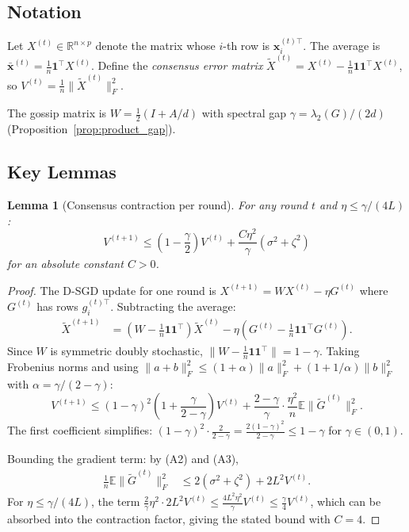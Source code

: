 \documentclass{article}
\newtheorem{lemma}[theorem]{Lemma}
\newcommand{\R}{\mathbb{R}}
\newcommand{\E}{\mathbb{E}}
\newcommand{\bx}{\mathbf{x}}
\newcommand{\lam}{\lambda_2}
\begin{document}
\subsection{Notation}

Let $X^{(t)} \in \R^{n \times p}$ denote the matrix whose $i$-th row
is $\bx_i^{(t)\top}$.  The average is
$\bar{\bx}^{(t)} = \frac{1}{n}\mathbf{1}^\top X^{(t)}$.
Define the \emph{consensus error matrix}
$\tilde{X}^{(t)} = X^{(t)} - \frac{1}{n}\mathbf{1}\mathbf{1}^\top X^{(t)}$,
so $V^{(t)} = \frac{1}{n}\|\tilde{X}^{(t)}\|_F^2$.

The gossip matrix is $W = \frac{1}{2}(I + A/d)$ with
spectral gap $\gamma = \lam(G)/(2d)$ (Proposition~\ref{prop:product_gap}).

\subsection{Key Lemmas}

\begin{lemma}[Consensus contraction per round]
\label{lem:consensus_contract}
For any round $t$ and $\eta \le \gamma/(4L)$:
\[
V^{(t+1)} \le \left(1 - \frac{\gamma}{2}\right) V^{(t)}
+ \frac{C\eta^2}{\gamma}\left(\sigma^2 + \zeta^2\right)
\]
for an absolute constant $C > 0$.
\end{lemma}
\begin{proof}
The D-SGD update for one round is
$X^{(t+1)} = W X^{(t)} - \eta G^{(t)}$
where $G^{(t)}$ has rows $g_i^{(t)\top}$.  Subtracting the average:
\begin{align*}
\tilde{X}^{(t+1)} &= \left(W - \tfrac{1}{n}\mathbf{1}\mathbf{1}^\top\right)\tilde{X}^{(t)}
- \eta\left(G^{(t)} - \tfrac{1}{n}\mathbf{1}\mathbf{1}^\top G^{(t)}\right).
\end{align*}
Since $W$ is symmetric doubly stochastic,
$\|W - \frac{1}{n}\mathbf{1}\mathbf{1}^\top\| = 1 - \gamma$.
Taking Frobenius norms and using
$\|a + b\|_F^2 \le (1+\alpha)\|a\|_F^2 + (1+1/\alpha)\|b\|_F^2$
with $\alpha = \gamma/(2 - \gamma)$:
\[
V^{(t+1)} \le (1-\gamma)^2\left(1 + \frac{\gamma}{2-\gamma}\right) V^{(t)}
+ \frac{2-\gamma}{\gamma} \cdot \frac{\eta^2}{n}\E\|\tilde{G}^{(t)}\|_F^2.
\]
The first coefficient simplifies:
$(1-\gamma)^2 \cdot \frac{2}{2-\gamma} = \frac{2(1-\gamma)^2}{2-\gamma}
\le 1 - \gamma$ for $\gamma \in (0,1)$.

Bounding the gradient term: by (A2) and (A3),
\begin{align*}
\frac{1}{n}\E\|\tilde{G}^{(t)}\|_F^2
&\le 2(\sigma^2 + \zeta^2) + 2L^2 V^{(t)}.
\end{align*}
For $\eta \le \gamma/(4L)$, the term
$\frac{2}{\gamma}\eta^2 \cdot 2L^2 V^{(t)}
\le \frac{4L^2\eta^2}{\gamma}V^{(t)}
\le \frac{\gamma}{4}V^{(t)}$,
which can be absorbed into the contraction factor, giving the stated
bound with $C = 4$.
\end{proof}
\end{document}
